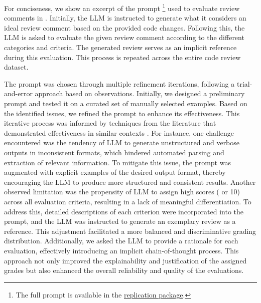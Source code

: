 For conciseness, we show an excerpt of the prompt \footnote{The full prompt is available in the \href{https://github.com/AI4CodeReview/CuREV}{replication package}.} used to evaluate review comments in .
Initially, the LLM is instructed to generate what it considers an ideal review comment based on the provided code changes. 
Following this, the LLM is asked to evaluate the given review comment according to the different categories and criteria. 
The generated review serves as an implicit reference during this evaluation. 
This process is repeated across the entire code review dataset.

The prompt was chosen through multiple refinement iterations, following a trial-and-error approach based on observations. Initially, we designed a preliminary prompt and tested it on a curated set of manually selected examples. Based on the identified issues, we refined the prompt to enhance its effectiveness. This iterative process was informed by techniques from the literature that demonstrated effectiveness in similar contexts \cite{weyssow2024codeultrafeedback}. 
For instance, one challenge encountered was the tendency of LLM to generate unstructured and verbose outputs in inconsistent formats, which hindered automated parsing and extraction of relevant information. To mitigate this issue, the prompt was augmented with explicit examples of the desired output format, thereby encouraging the LLM to produce more structured and consistent results.
Another observed limitation was the propensity of LLM to assign high scores ( or 10) across all evaluation criteria, resulting in a lack of meaningful differentiation. To address this, detailed descriptions of each criterion were incorporated into the prompt, and the LLM was instructed to generate an exemplary review as a reference. This adjustment facilitated a more balanced and discriminative grading distribution. Additionally, we asked the LLM to provide a rationale for each evaluation, effectively introducing an implicit chain-of-thought process. This approach not only improved the explainability and justification of the assigned grades but also enhanced the overall reliability and quality of the evaluations.

